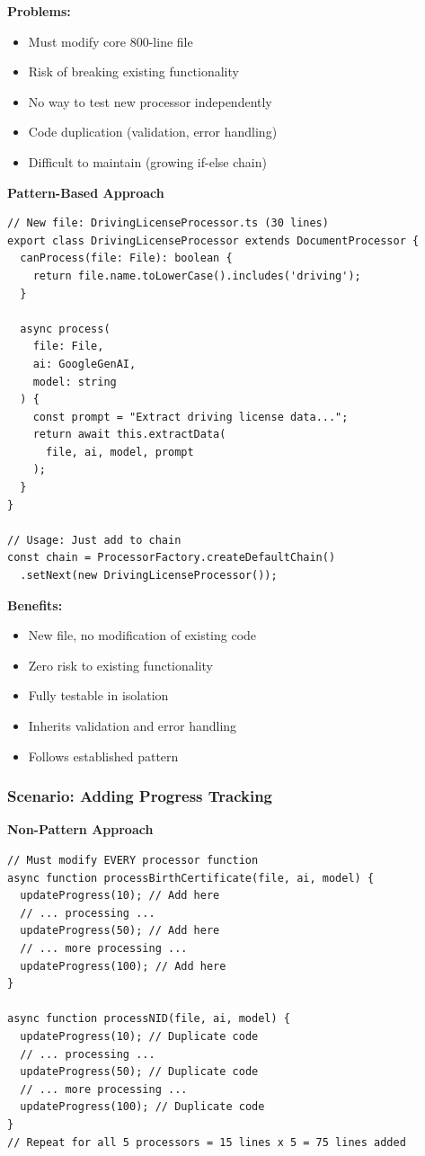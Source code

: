 \documentclass[11pt, a4paper]{article}
\theoremstyle{plain}
\theoremstyle{definition}
\begin{document}
\textbf{Problems:}
\begin{itemize}
    \item Must modify core 800-line file
    \item Risk of breaking existing functionality
    \item No way to test new processor independently
    \item Code duplication (validation, error handling)
    \item Difficult to maintain (growing if-else chain)
\end{itemize}

{\bfseries Pattern-Based Approach}\par

\begin{lstlisting}[caption={Pattern-Based: Adding New Document Type}]
// New file: DrivingLicenseProcessor.ts (30 lines)
export class DrivingLicenseProcessor extends DocumentProcessor {
  canProcess(file: File): boolean {
    return file.name.toLowerCase().includes('driving');
  }
  
  async process(
    file: File, 
    ai: GoogleGenAI, 
    model: string
  ) {
    const prompt = "Extract driving license data...";
    return await this.extractData(
      file, ai, model, prompt
    );
  }
}

// Usage: Just add to chain
const chain = ProcessorFactory.createDefaultChain()
  .setNext(new DrivingLicenseProcessor());
\end{lstlisting}

\textbf{Benefits:}
\begin{itemize}
    \item New file, no modification of existing code
    \item Zero risk to existing functionality
    \item Fully testable in isolation
    \item Inherits validation and error handling
    \item Follows established pattern
\end{itemize}

\subsubsection{Scenario: Adding Progress Tracking}

{\bfseries Non-Pattern Approach}\par
\begin{lstlisting}[caption={Non-Pattern: Adding Progress Tracking}, frame=tb]
// Must modify EVERY processor function
async function processBirthCertificate(file, ai, model) {
  updateProgress(10); // Add here
  // ... processing ...
  updateProgress(50); // Add here
  // ... more processing ...
  updateProgress(100); // Add here
}

async function processNID(file, ai, model) {
  updateProgress(10); // Duplicate code
  // ... processing ...
  updateProgress(50); // Duplicate code
  // ... more processing ...
  updateProgress(100); // Duplicate code
}
// Repeat for all 5 processors = 15 lines x 5 = 75 lines added
\end{lstlisting}
\end{document}
